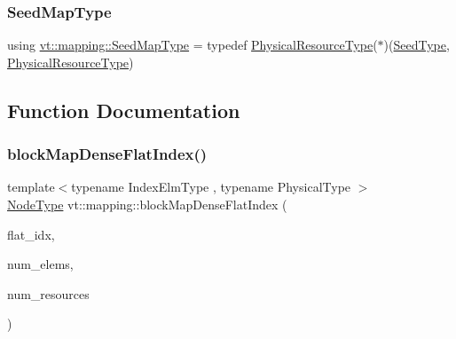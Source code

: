 \mbox{\label{namespacevt_1_1mapping_a1c1409d9af8d1ac402af022a65be4a4d}} 
\subsubsection{\texorpdfstring{Seed\+Map\+Type}{SeedMapType}}
{\footnotesize\ttfamily using \hyperlink{namespacevt_1_1mapping_a1c1409d9af8d1ac402af022a65be4a4d}{vt\+::mapping\+::\+Seed\+Map\+Type} = typedef \hyperlink{namespacevt_a2dc36fcada816dc6d11774d650328ee9}{Physical\+Resource\+Type}($\ast$)(\hyperlink{namespacevt_ae2e13198bdef4d5b8e603d6c1c7f0969}{Seed\+Type}, \hyperlink{namespacevt_a2dc36fcada816dc6d11774d650328ee9}{Physical\+Resource\+Type})}



\subsection{Function Documentation}
\mbox{\label{namespacevt_1_1mapping_abaff3ea69ef07a3762befc3628b8b577}} 
\subsubsection{\texorpdfstring{block\+Map\+Dense\+Flat\+Index()}{blockMapDenseFlatIndex()}}
{\footnotesize\ttfamily template$<$typename Index\+Elm\+Type , typename Physical\+Type $>$ \\
\hyperlink{namespacevt_a866da9d0efc19c0a1ce79e9e492f47e2}{Node\+Type} vt\+::mapping\+::block\+Map\+Dense\+Flat\+Index (\begin{DoxyParamCaption}\item[{Index\+Elm\+Type $\ast$}]{flat\+\_\+idx,  }\item[{Index\+Elm\+Type $\ast$}]{num\+\_\+elems,  }\item[{Physical\+Type}]{num\+\_\+resources }\end{DoxyParamCaption})\hspace{0.3cm}{\ttfamily [inline]}}

\mbox{\label{namespacevt_1_1mapping_ae055a42b89a59fd6d0cc6d40f9abf3b5}} 
